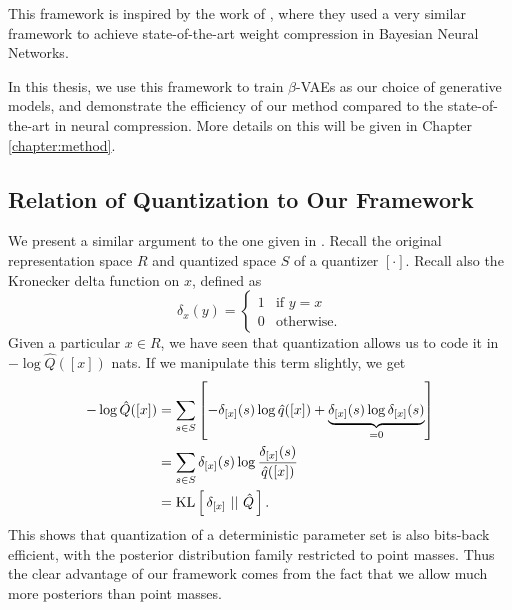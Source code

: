 \par 
This framework is inspired by the work of \cite{havasi2018minimal}, where they
used a very similar framework to achieve state-of-the-art weight compression in
Bayesian Neural Networks.
\par
In this thesis, we use this framework to train $\beta$-VAEs as our choice of
generative models, and demonstrate the efficiency of our method compared to the
state-of-the-art in neural compression. More details on this will be given in
Chapter \ref{chapter:method}. 

\subsection{Relation of Quantization to Our Framework}
\par
We present a similar argument to the one given in \cite{havasi2018minimal}.
Recall the original representation space $R$ and quantized space $S$ of a
quantizer $[\cdot]$. Recall also the Kronecker delta function on $x$, defined as 
\[
  \delta_{x}(y) = 
  \begin{cases}
    1 & \text{if } y = x \\
    0 & \text{otherwise}.
  \end{cases}
\]
Given a particular $x \in R$, we have seen that
quantization allows us to code it in $-\log \hat{Q}([x])$ nats. If we manipulate
this term slightly, we get
\begin{align*}
  -\log \hat{Q}([x]) &= \sum_{s \in S} \left[ -\delta_{[x]}(s)\log \hat{q}([x]) + \underbrace{\delta_{[x]}(s) \log \delta_{[x]}(s)}_{= 0} \right] \\
                     &= \sum_{s \in S} \delta_{[x]}(s)\log\frac{\delta_{[x]}(s)}{\hat{q}([x])} \\
                     &= \mathrm{KL}\left[\,\delta_{[x]}\,\,||\,\,\hat{Q}\,\right].
\end{align*}
This shows that quantization of a deterministic parameter set is also
bits-back efficient, with the posterior distribution family restricted to point masses. Thus
the clear advantage of our framework comes from the fact that we allow much more
posteriors than point masses. 

